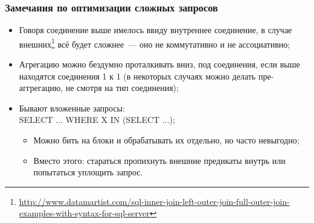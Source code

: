 \documentclass{beamer}
\begin{document}
\begin{frame}
\frametitle{Замечания по оптимизации сложных запросов}

\begin{itemize}
  \item Говоря соединение выше имелось ввиду внутреннее соединение, в случае внешних\footnote{\url{http://www.datamartist.com/sql-inner-join-left-outer-join-full-outer-join-examples-with-syntax-for-sql-server}} всё будет сложнее~--- оно не коммутативно и не ассоциативно;
  \item Агрегацию можно бездумно проталкивать вниз, под соединения, если выше находятся соединения 1 к 1 (в некоторых случаях можно делать пре-аггрегацию, не смотря на тип соединения);
  \item Бывают вложенные запросы:\\ SELECT ... WHERE X IN (SELECT ...);
  \begin{itemize}
    \item Можно бить на блоки и обрабатывать их отдельно, но часто невыгодно;
    \item Вместо этого: стараться пропихнуть внешние предикаты внутрь или попытаться уплощить запрос.
  \end{itemize}
\end{itemize}

\end{frame}
\end{document}
